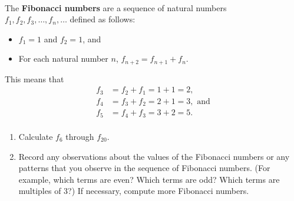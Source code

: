 \hbreak
%
\begin{previewactivity} \label{PA:fibonaccinumbers} \hfill \\
The \textbf{Fibonacci numbers}
%
 are a sequence of natural numbers  \\$f_1 ,f_2 ,f_3 , \ldots ,f_n , \ldots $ 
\label{sym:fibonacci} defined as follows:
\begin{itemize}
\item $f_1  = 1$ and  $f_2  = 1$, and

\item For each natural number  $n$,   $f_{n + 2}  = f_{n + 1}  + f_n $.
\end{itemize}
%
This means that
\[
\begin{aligned}
f_3  &= f_2  + f_1  = 1 + 1 = 2, \\
f_4  &= f_3  + f_2  = 2 + 1 = 3, \text{ and} \\
f_5  &= f_4  + f_3 = 3 + 2 = 5. \\
\end{aligned}
\]

%
\begin{enumerate}
\item Calculate  $f_6$ through $f_{20}$.


\item Record any observations about the values of the Fibonacci numbers or any patterns that you observe in the sequence of Fibonacci numbers.  (For example, which terms are even?  Which terms are odd?  Which terms are multiples of 3?)  If necessary, compute more Fibonacci numbers.

\end{enumerate}
\end{previewactivity}
\hbreak
%
